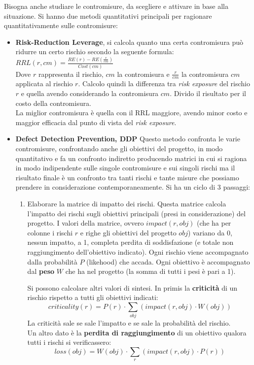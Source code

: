 Bisogna anche studiare le contromisure, da scegliere e attivare in base alla situazione. Si hanno due metodi quantitativi principali per ragionare quantitativamente sulle contromisure:
\begin{itemize}
    \item \textbf{Risk-Reduction Leverage}, si calcola quanto una certa contromisura può ridurre un certo rischio  secondo la seguente formula: $\displaystyle RRL(r, cm)=\frac{RE(r)-RE(\frac{r}{cm})}{Cost(cm)}$ \\
    Dove $r$ rappresenta il rischio, $cm$ la contromisura e $\frac{r}{cm}$ la contromisura $cm$ applicata al rischio $r$. Calcolo quindi la differenza tra \textit{risk exposure} del rischio $r$ e quella avendo considerando la contromisura $cm$. Divido il risultato per il costo della contromisura.\\ La miglior contromisura è quella con il RRL maggiore, avendo minor costo e maggior efficacia dal punto di vista del \textit{risk exposure}.
    \item \textbf{Defect Detection Prevention, DDP}
    Questo metodo confronta le varie contromisure, confrontando anche gli obiettivi del progetto, in modo quantitativo e fa un confronto indiretto producendo matrici in cui si ragiona in modo indipendente sulle singole contromisure e sui singoli rischi ma il risultato finale è un confronto tra tanti rischi e tante misure che possiamo prendere in considerazione contemporaneamente. Si ha un ciclo di 3 passaggi:
    \begin{enumerate}
        \item Elaborare la matrice di impatto dei rischi. Questa matrice calcola l'impatto dei rischi sugli obiettivi principali (presi in considerazione) del progetto. 
        I valori della matrice, ovvero $impact(r, obj)$ (che ha per colonne i rischi $r$ e righe gli obiettivi del progetto $obj$) variano da 0, nessun impatto, a 1, completa perdita di soddisfazione (e totale non raggiungimento dell'obiettivo indicato). Ogni rischio viene accompagnato dalla probabilità $P$ (likehood) che accada. Ogni obiettivo è accompagnato dal \textbf{peso} $W$ che ha nel progetto (la somma di tutti i pesi è pari a 1). 
        
        Si possono calcolare altri valori di sintesi. In primis la \textbf{criticità} di un rischio rispetto a tutti gli obiettivi indicati: \[criticality(r)=P(r)\cdot\sum_{obj}(impact(r, obj)\cdot W(obj))\] La criticità sale se sale l'impatto e se sale la probabilità del rischio.\\ Un altro dato è la \textbf{perdita di raggiungimento} di un obiettivo qualora tutti i rischi si verificassero: \[loss(obj)=W(obj)\cdot\sum_{r}(impact(r, obj)\cdot P(r))\]
        

\end{enumerate}
\end{itemize}
